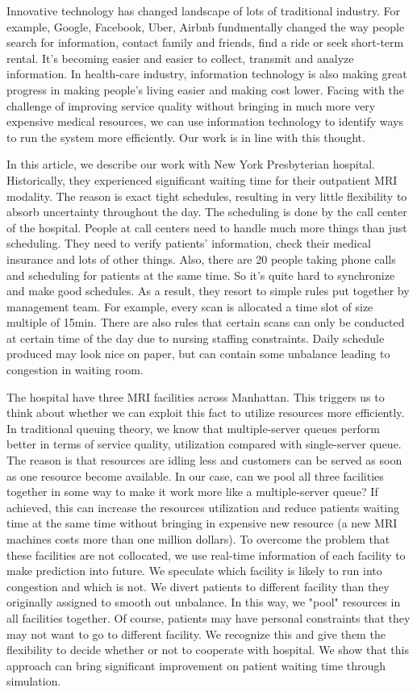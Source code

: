 Innovative technology has changed landscape of lots of traditional industry. For example, Google, Facebook, Uber, Airbnb fundmentally changed the way people search for information, contact family and friends, find a ride or seek short-term rental. It's becoming easier and easier to collect, transmit and analyze information. In health-care industry, information technology is also making great progress in making people's living easier and making cost lower. Facing with the challenge of improving service quality without bringing in much more very expensive medical resources, we can use information technology to identify ways to run the system more efficiently. Our work is in line with this thought.

In this article, we describe our work with New York Presbyterian hospital. Historically, they experienced significant waiting time for their outpatient MRI modality. The reason is exact tight schedules, resulting in very little flexibility to absorb uncertainty throughout the day. The scheduling is done by the call center of the hospital. People at call centers need to handle much more things than just scheduling. They need to verify patients' information, check their medical insurance and lots of other things. Also, there are 20 people taking phone calls and scheduling for patients at the same time. So it's quite hard to synchronize and make good schedules. As a result, they resort to simple rules put together by management team. For example, every scan is allocated a time slot of size multiple of 15min. There are also rules that certain scans can only be conducted at certain time of the day due to nursing staffing constraints. Daily schedule produced may look nice on paper, but can contain some unbalance leading to congestion in waiting room.

The hospital have three MRI facilities across Manhattan. This triggers us to think about whether we can exploit this fact to utilize resources more efficiently. In traditional queuing theory, we know that multiple-server queues perform better in terms of service quality, utilization compared with single-server queue. The reason is that resources are idling less and customers can be served as soon as one resource become available. In our case, can we pool all three facilities together in some way to make it work more like a multiple-server queue? If achieved, this can increase the resources utilization and reduce patients waiting time at the same time without bringing in expensive new resource (a new MRI machines costs more than one million dollars). To overcome the problem that these facilities are not collocated, we use real-time information of each facility to make prediction into future. We speculate which facility is likely to run into congestion and which is not. We divert patients to different facility than they originally assigned to smooth out unbalance. In this way, we "pool" resources in all facilities together. Of course, patients may have personal constraints that they may not want to go to different facility. We recognize this and give them the flexibility to decide whether or not to cooperate with hospital. We show that this approach can bring significant improvement on patient waiting time through simulation.

